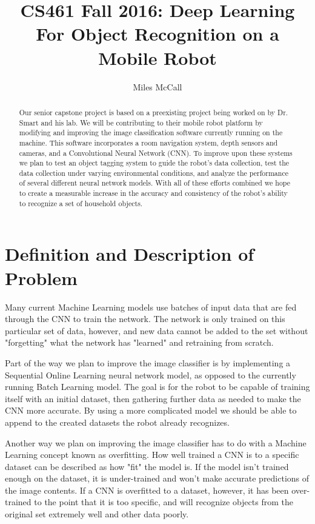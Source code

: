 \documentclass[a4paper, 10pt]{article}
\title{CS461 Fall 2016: Deep Learning For Object Recognition on a Mobile Robot}
\author{Miles McCall}
\begin{document}
\maketitle 

\begin{abstract}
Our senior capstone project is based on a preexisting project being worked on by Dr. Smart and his lab. We will be contributing to their mobile robot platform by modifying and improving the image classification software currently running on the machine. This software incorporates a room navigation system, depth sensors and cameras, and a Convolutional Neural Network (CNN). To improve upon these systems we plan to test an object tagging system to guide the robot's data collection, test the data collection under varying environmental conditions, and analyze the performance of several different neural network models. With all of these efforts combined we hope to create a measurable increase in the accuracy and consistency of the robot's ability to recognize a set of household objects. 
\end{abstract}

\newpage

\section{Definition and Description of Problem}
Many current Machine Learning models use batches of input data that are fed through the CNN to train the network. The network is only trained on this particular set of data, however, and new data cannot be added to the set without "forgetting" what the network has "learned" and retraining from scratch. 

Part of the way we plan to improve the image classifier is by implementing a Sequential Online Learning neural network model, as opposed to the currently running Batch Learning model. The goal is for the robot to be capable of training itself with an initial dataset, then gathering further data as needed to make the CNN more accurate. By using a more complicated model we should be able to append to the created datasets the robot already recognizes. 

Another way we plan on improving the image classifier has to do with a Machine Learning concept known as overfitting. How well trained a CNN is to a specific dataset can be described as how "fit" the model is. If the model isn't trained enough on the dataset, it is under-trained and won't make accurate predictions of the image contents. If a CNN is overfitted to a dataset, however, it has been over-trained to the point that it is too specific, and will recognize objects from the original set extremely well and other data poorly. 
\end{document}
